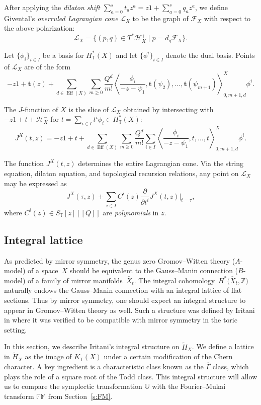 \documentclass[11pt]{article}
\numberwithin{equation}{section}
\numberwithin{equation}{section}
\newcommand{\cc}[1]{\mathcal{#1}} %
\newcommand{\ZZ}{\mathbb{Z}}
\newcommand{\bt}{{\bm{t}}}
\newcommand{\torus}{\mathbb{T}}
\newcommand{\FM}{\mathbb{FM}}
\DeclareMathOperator{\eff}{Eff}
\newcommand{\br}[1]{\left\langle#1\right\rangle} %
\begin{document}
\begin{Definition}
After applying the \emph{dilaton shift} $\sum_{a=0}^s t_a z^a = z1 + \sum_{a=0}^s q_a z^a$, we define Givental's \emph{overruled Lagrangian cone} $\cc L_X$ to be the graph of $\cc F_X$ with respect to the above polarization:
\[
\cc L_X = \bigl\{ (p, q) \in T^*\cc H_X^+ \mid p = d_q \cc F_X\bigr\}.
\]
\end{Definition}
Let $\{\phi_i\}_{i \in I}$ be a basis for $H^*_\torus(X)$ and let $\{\phi^i\}_{i \in I}$ denote the dual basis.
Points of $\cc L_X$ are of the form
\[
-z 1 + \bt(z) + \sum_{d \in \eff(X)} \sum_{m \geq 0} \frac{Q^d}{m!} \br{\frac{\phi_i}{-z - \psi_1}, \bt(\psi_2), \dots, \bt(\psi_{m+1})}_{0, m+1, d}^X \phi^i.
\]
\begin{Definition}
The $J$-function of $X$ is the slice of $\cc L_X$ obtained by intersecting with $-z 1 + t + \cc H_X^-$ for $t = \sum_{i \in I} t^i \phi_i \in H^*_\torus(X)$:
\[
J^X(t, z) = -z 1 + t+ \sum_{d \in \eff(X)} \sum_{m \geq 0} \frac{Q^d}{m!} \sum_{i \in I}\br{\frac{\phi_i}{-z - \psi_1}, t, \dots, t}_{0, m+1, d}^X \phi^i.
\]

\end{Definition}
The function $J^X(t, z)$ determines the entire Lagrangian cone. Via the string equation, dilaton equation, and topological recursion relations, any point on $\cc L_X$ may be expressed as
\[
J^X(\tau , z) + \sum_{i \in I} C^i(z) \frac{\partial}{\partial{t^i}} J^X(t, z)|_{t=\tau},
\]
where $C^i(z) \in S_\torus[z][\![Q]\!]$ are \emph{polynomials} in $z$.


\subsection{Integral lattice}
As predicted by mirror symmetry, the genus zero Gromov--Witten theory ($A$-model) of a space~$X$ should be equivalent to the Gauss--Manin connection ($B$-model) of a family of mirror manifolds~$\check{X_t}$. The integral cohomology~$H^*\bigl(\check{X_t}, \ZZ\bigr)$ naturally endows the Gauss--Manin connection with an integral lattice of flat sections. Thus by mirror symmetry, one should expect an integral structure to appear in Gromov--Witten theory as well. Such a structure was defined by Iritani in \cite{IriInt} where it was verified to be compatible with mirror symmetry in the toric setting.

In this section, we describe Iritani's integral structure on $\tilde H_X$. We define a lattice in $\tilde H_X$ as the image of $K_\torus(X)$ under a certain modification of the Chern character. A key ingredient is a characteristic class known as the $\hat\Gamma$ class, which plays the role of a square root of the Todd class. This integral structure will allow us to compare the symplectic transformation $\mathbb{U}$ with the Fourier--Mukai transform $\FM$ from Section~\ref{s:FM}.
\end{document}

